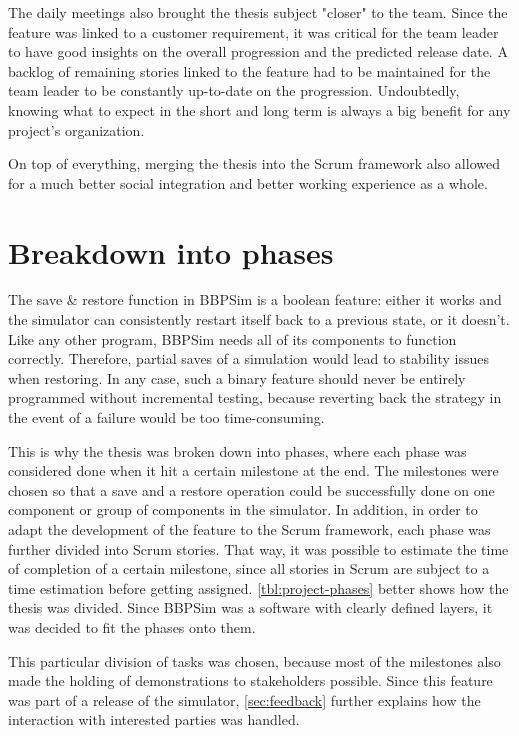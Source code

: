 {The daily meetings also brought the thesis subject "closer" to the team. Since the feature was linked to a customer requirement, it was critical for the team leader to have good insights on the overall progression and the predicted release date. A backlog of remaining stories linked to the feature had to be maintained for the team leader to be constantly up-to-date on the progression. Undoubtedly, knowing what to expect in the short and long term is always a big benefit for any project's organization. 

On top of everything, merging the thesis into the Scrum framework also allowed for a much better social integration and better working experience as a whole. 

\section{Breakdown into phases}
The save \& restore function in \gls{BBPSim} is a boolean feature: either it works and the simulator can consistently restart itself back to a previous state, or it doesn't. Like any other program, \gls{BBPSim} needs all of its components to function correctly. Therefore, partial saves of a simulation would lead to stability issues when restoring. 
In any case, such a binary feature should never be entirely programmed without incremental testing, because reverting back the strategy in the event of a failure would be too time-consuming.

This is why the thesis was broken down into phases, where each phase was considered done when it hit a certain milestone at the end. The milestones were chosen so that a save and a restore operation could be successfully done on one component or group of components in the simulator. In addition, in order to adapt the development of the feature to the Scrum framework, each phase was further divided into Scrum stories. That way, it was possible to estimate the time of completion of a certain milestone, since all stories in Scrum are subject to a time estimation before getting assigned. \autoref{tbl:project-phases} better shows how the thesis was divided. Since \gls{BBPSim} was a software with clearly defined layers, it was decided to fit the phases onto them.

This particular division of tasks was chosen, because most of the milestones also made the holding of demonstrations to stakeholders possible. Since this feature was part of a release of the simulator, \autoref{sec:feedback} further explains how the interaction with interested parties was handled.

}
